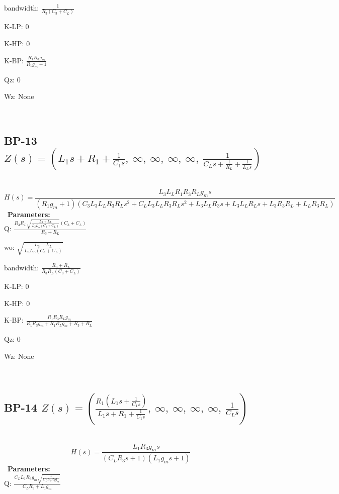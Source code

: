 \documentclass{article}
\begin{document}
bandwidth: $\frac{1}{R_{3} \left(C_{3} + C_{L}\right)}$\ 

K-LP: $0$\ 

K-HP: $0$\ 

K-BP: $\frac{R_{1} R_{3} g_{m}}{R_{1} g_{m} + 1}$\ 

Qz: $0$\ 

Wz: $\text{None}$\ 

\ 

\subsection{BP-13 $Z(s) = \left( L_{1} s + R_{1} + \frac{1}{C_{1} s}, \  \infty, \  \infty, \  \infty, \  \infty, \  \frac{1}{C_{L} s + \frac{1}{R_{L}} + \frac{1}{L_{L} s}}\right)$ } \ 
\textbf{\[H(s) = \frac{L_{3} L_{L} R_{1} R_{3} R_{L} g_{m} s}{\left(R_{1} g_{m} + 1\right) \left(C_{3} L_{3} L_{L} R_{3} R_{L} s^{2} + C_{L} L_{3} L_{L} R_{3} R_{L} s^{2} + L_{3} L_{L} R_{3} s + L_{3} L_{L} R_{L} s + L_{3} R_{3} R_{L} + L_{L} R_{3} R_{L}\right)}\] } \ 
\textbf{Parameters:}\\ 

Q: $\frac{R_{3} R_{L} \sqrt{\frac{L_{3} + L_{L}}{L_{3} L_{L} \left(C_{3} + C_{L}\right)}} \left(C_{3} + C_{L}\right)}{R_{3} + R_{L}}$\ 

wo: $\sqrt{\frac{L_{3} + L_{L}}{L_{3} L_{L} \left(C_{3} + C_{L}\right)}}$\ 

bandwidth: $\frac{R_{3} + R_{L}}{R_{3} R_{L} \left(C_{3} + C_{L}\right)}$\ 

K-LP: $0$\ 

K-HP: $0$\ 

K-BP: $\frac{R_{1} R_{3} R_{L} g_{m}}{R_{1} R_{3} g_{m} + R_{1} R_{L} g_{m} + R_{3} + R_{L}}$\ 

Qz: $0$\ 

Wz: $\text{None}$\ 

\ 

\subsection{BP-14 $Z(s) = \left( \frac{R_{1} \left(L_{1} s + \frac{1}{C_{1} s}\right)}{L_{1} s + R_{1} + \frac{1}{C_{1} s}}, \  \infty, \  \infty, \  \infty, \  \infty, \  \frac{1}{C_{L} s}\right)$ } \ 
\textbf{\[H(s) = \frac{L_{1} R_{3} g_{m} s}{\left(C_{L} R_{3} s + 1\right) \left(L_{1} g_{m} s + 1\right)}\] } \ 
\textbf{Parameters:}\\ 

Q: $\frac{C_{L} L_{1} R_{3} g_{m} \sqrt{\frac{1}{C_{L} L_{1} R_{3} g_{m}}}}{C_{L} R_{3} + L_{1} g_{m}}$\ 
\end{document}
